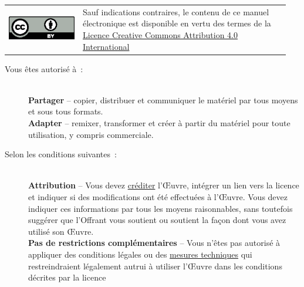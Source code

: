 \begin{tcolorbox}[
	colback=white, 
	colframe=black,
	toprule=1pt,
	bottomrule=1pt,
	leftrule=1pt,
	rightrule=1pt,
	before upper={\begin{minipage}[t]{\linewidth}},
    after upper={\end{minipage}},
]
\begin{tabular}{m{0.25\linewidth}m{0.7\linewidth}}
\includegraphics{images/CC/by.eps} & 
Sauf indications contraires, le contenu de ce manuel électronique est disponible en vertu des termes de la \href{https://creativecommons.org/licenses/by/4.0/deed.fr}{Licence Creative Commons Attribution 4.0 International} \\
\end{tabular}
{\footnotesize
\begin{description}
  \item[Vous êtes autorisé à~:] ~\\
  \textbf{Partager} -- copier, distribuer et communiquer le matériel par tous moyens et sous tous formats.\\
  \textbf{Adapter} -- remixer, transformer et créer à partir du matériel pour toute utilisation, y compris commerciale.


\item[Selon les conditions suivantes~:] ~\\
  \textbf{Attribution} -- Vous devez \href{https://creativecommons.org/licenses/by/4.0/deed.fr\#}{créditer} l'Œuvre, intégrer un lien vers la licence et indiquer si des modifications ont été effectuées à l'Œuvre. Vous devez indiquer ces informations par tous les moyens raisonnables, sans toutefois suggérer que l'Offrant vous soutient ou soutient la façon dont vous avez utilisé son Œuvre.\\
  \textbf{Pas de restrictions complémentaires} -- Vous n'êtes pas autorisé à appliquer des conditions légales ou des \href{https://creativecommons.org/licenses/by/4.0/deed.fr\#}{mesures techniques} qui restreindraient légalement autrui à utiliser l'Œuvre dans les conditions décrites par la licence
\end{description}
}
\end{tcolorbox}

